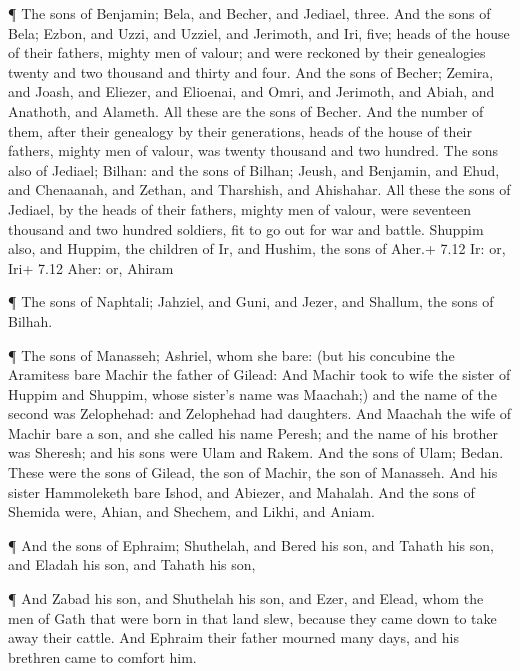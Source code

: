  ¶ The sons of Benjamin; Bela, and Becher, and Jediael,
three.  And the sons of Bela; Ezbon, and Uzzi, and Uzziel,
and Jerimoth, and Iri, five; heads of the house of their fathers, mighty
men of valour; and were reckoned by their genealogies twenty and two
thousand and thirty and four.  And the sons of Becher;
Zemira, and Joash, and Eliezer, and Elioenai, and Omri, and Jerimoth,
and Abiah, and Anathoth, and Alameth. All these are the sons of Becher.
 And the number of them, after their genealogy by their
generations, heads of the house of their fathers, mighty men of valour,
was twenty thousand and two hundred.  The sons also of
Jediael; Bilhan: and the sons of Bilhan; Jeush, and Benjamin, and Ehud,
and Chenaanah, and Zethan, and Tharshish, and Ahishahar. 
All these the sons of Jediael, by the heads of their fathers, mighty men
of valour, were seventeen thousand and two hundred soldiers, fit to go
out for war and battle.  Shuppim also, and Huppim, the
children of Ir, and Hushim, the sons of Aher.+ 7.12 Ir: or, Iri+ 7.12
Aher: or, Ahiram

 ¶ The sons of Naphtali; Jahziel, and Guni, and Jezer, and
Shallum, the sons of Bilhah.

 ¶ The sons of Manasseh; Ashriel, whom she bare: (but his
concubine the Aramitess bare Machir the father of Gilead: 
And Machir took to wife the sister of Huppim and Shuppim, whose sister's
name was Maachah;) and the name of the second was Zelophehad: and
Zelophehad had daughters.  And Maachah the wife of Machir
bare a son, and she called his name Peresh; and the name of his brother
was Sheresh; and his sons were Ulam and Rakem.  And the
sons of Ulam; Bedan. These were the sons of Gilead, the son of Machir,
the son of Manasseh.  And his sister Hammoleketh bare
Ishod, and Abiezer, and Mahalah.  And the sons of Shemida
were, Ahian, and Shechem, and Likhi, and Aniam.

 ¶ And the sons of Ephraim; Shuthelah, and Bered his son,
and Tahath his son, and Eladah his son, and Tahath his son,

 ¶ And Zabad his son, and Shuthelah his son, and Ezer, and
Elead, whom the men of Gath that were born in that land slew, because
they came down to take away their cattle.  And Ephraim
their father mourned many days, and his brethren came to comfort him.

